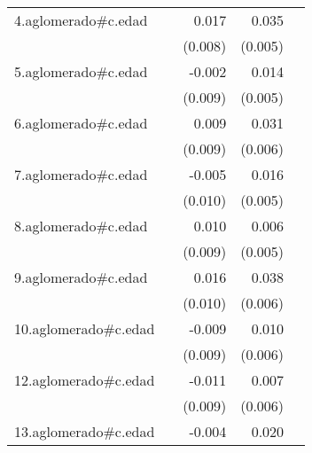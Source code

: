{\begin{longtable}{l*{4}{D{.}{.}{-1}}}
\addlinespace
4.aglomerado#c.edad&                     &       0.017\sym{*}  &       0.035\sym{***}&                     \\
            &                     &     (0.008)         &     (0.005)         &                     \\
\addlinespace
5.aglomerado#c.edad&                     &      -0.002         &       0.014\sym{**} &                     \\
            &                     &     (0.009)         &     (0.005)         &                     \\
\addlinespace
6.aglomerado#c.edad&                     &       0.009         &       0.031\sym{***}&                     \\
            &                     &     (0.009)         &     (0.006)         &                     \\
\addlinespace
7.aglomerado#c.edad&                     &      -0.005         &       0.016\sym{***}&                     \\
            &                     &     (0.010)         &     (0.005)         &                     \\
\addlinespace
8.aglomerado#c.edad&                     &       0.010         &       0.006         &                     \\
            &                     &     (0.009)         &     (0.005)         &                     \\
\addlinespace
9.aglomerado#c.edad&                     &       0.016         &       0.038\sym{***}&                     \\
            &                     &     (0.010)         &     (0.006)         &                     \\
\addlinespace
10.aglomerado#c.edad&                     &      -0.009         &       0.010         &                     \\
            &                     &     (0.009)         &     (0.006)         &                     \\
\addlinespace
12.aglomerado#c.edad&                     &      -0.011         &       0.007         &                     \\
            &                     &     (0.009)         &     (0.006)         &                     \\
\addlinespace
13.aglomerado#c.edad&                     &      -0.004         &       0.020\sym{***}&                     \\

\end{longtable}}
